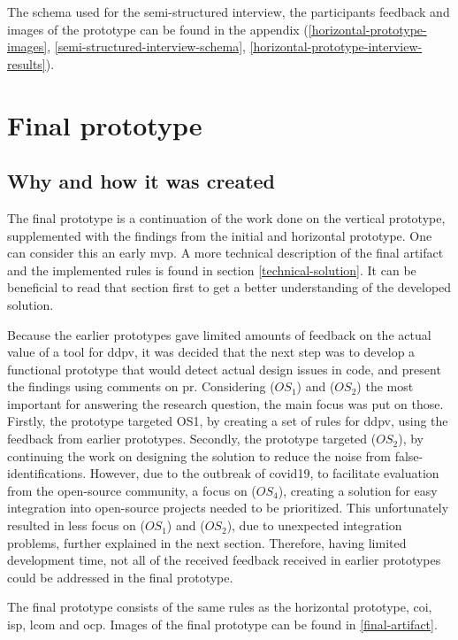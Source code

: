 \documentclass{report}
\begin{document}
The schema used for the semi-structured interview, the participants feedback and images of the prototype can be found in the appendix (\ref{horizontal-prototype-images}, \ref{semi-structured-interview-schema}, \ref{horizontal-prototype-interview-results}).

\section{Final prototype}
\label{final-prototype}

\subsection*{Why and how it was created}
The final prototype is a continuation of the work done on the vertical prototype, supplemented with the findings from the initial and horizontal prototype. One can consider this an early \gls{mvp}. A more technical description of the final artifact and the implemented rules is found in section \ref{technical-solution}. It can be beneficial to read that section first to get a better understanding of the developed solution.

Because the earlier prototypes gave limited amounts of feedback on the actual value of a tool for \gls{ddpv}, it was decided that the next step was to develop a functional prototype that would detect actual design issues in code, and present the findings using comments on \gls{pr}. Considering (\(OS_{1}\)) and (\(OS_{2}\)) the most important for answering the research question, the main focus was put on those. Firstly, the prototype targeted OS1, by creating a set of rules for \gls{ddpv}, using the feedback from earlier prototypes. Secondly, the prototype targeted (\(OS_{2}\)), by continuing the work on designing the solution to reduce the noise from false-identifications. However, due to the outbreak of \gls{covid19}, to facilitate evaluation from the open-source community, a focus on (\(OS_{4}\)), creating a solution for easy integration into open-source projects needed to be prioritized. This unfortunately resulted in less focus on (\(OS_{1}\)) and (\(OS_{2}\)), due to unexpected integration problems, further explained in the next section. Therefore, having limited development time, not all of the received feedback received in earlier prototypes could be addressed in the final prototype. 

The final prototype consists of the same rules as the horizontal prototype, \gls{coi}, \gls{isp}, \gls{lcom} and \gls{ocp}. Images of the final prototype can be found in \ref{final-artifact}.
\end{document}
